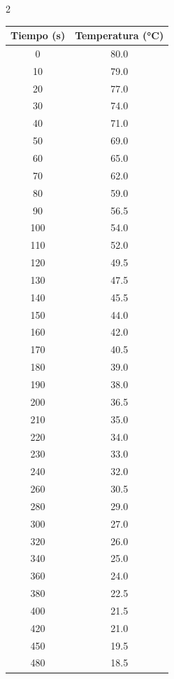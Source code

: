 \documentclass[11pt,letterpaper]{article}
\begin{document}
\newpage
\begin{multicols}{2}
    

\begin{tabular}{|c|c|}
		\hline
		\textbf{Tiempo (s)} & \textbf{Temperatura (°C)} \\ \hline
		0    & 80.0  \\ \hline
		10   & 79.0  \\ \hline
		20   & 77.0  \\ \hline
		30   & 74.0  \\ \hline
		40   & 71.0  \\ \hline
		50   & 69.0  \\ \hline
		60   & 65.0  \\ \hline
		70   & 62.0  \\ \hline
		80   & 59.0  \\ \hline
		90   & 56.5  \\ \hline
		100  & 54.0  \\ \hline
		110  & 52.0  \\ \hline
		120  & 49.5  \\ \hline
		130  & 47.5  \\ \hline
		140  & 45.5  \\ \hline
		150  & 44.0  \\ \hline
		160  & 42.0  \\ \hline
		170  & 40.5  \\ \hline
		180  & 39.0  \\ \hline
		190  & 38.0  \\ \hline
		200  & 36.5  \\ \hline
		210  & 35.0  \\ \hline
		220  & 34.0  \\ \hline
		230  & 33.0  \\ \hline
		240  & 32.0  \\ \hline
		260  & 30.5  \\ \hline
		280  & 29.0  \\ \hline
		300  & 27.0  \\ \hline
		320  & 26.0  \\ \hline
		340  & 25.0  \\ \hline
		360  & 24.0  \\ \hline
		380  & 22.5  \\ \hline
		400  & 21.5  \\ \hline
		420  & 21.0  \\ \hline
		450  & 19.5  \\ \hline
		480  & 18.5  \\ \hline

\end{tabular}
\end{multicols}
\end{document}
